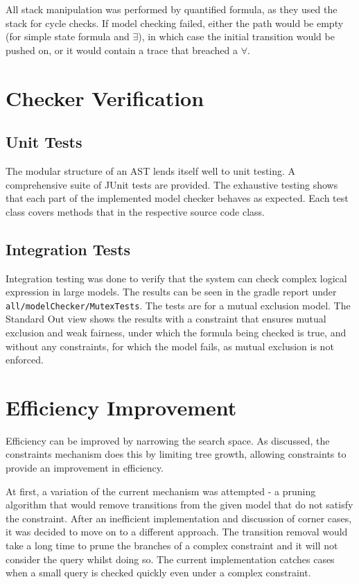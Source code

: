\documentclass[a4paper,11pt]{article}
\begin{document}
	All stack manipulation was performed by quantified formula, as they used the stack for cycle checks. If model checking failed, either the path would be empty (for simple state formula and $\exists$), in which case the initial transition would be pushed on, or it would contain a trace that breached a $\forall$.
	
	\section{Checker Verification}
	\subsection{Unit Tests}
	The modular structure of an AST lends itself well to unit testing. A comprehensive suite of JUnit tests are provided. The exhaustive testing shows that each part of the implemented model checker behaves as expected. Each test class covers methods that in the respective source code class.
	
	\subsection{Integration Tests}
	Integration testing was done to verify that the system can check complex logical expression in large models. The results can be seen in the gradle report under \texttt{all/modelChecker/MutexTests}. The tests are for a mutual exclusion model. The Standard Out view shows the results with a constraint that ensures mutual exclusion and weak fairness, under which the formula being checked is true, and without any constraints, for which the model fails, as mutual exclusion is not enforced.
	
	\section{Efficiency Improvement}
	Efficiency can be improved by narrowing the search space. As discussed, the constraints mechanism does this by limiting tree growth, allowing constraints to provide an improvement in efficiency.
	
	At first, a variation of the current mechanism was attempted - a pruning algorithm that would remove transitions from the given model that do not satisfy the constraint. After an inefficient implementation and discussion of corner cases, it was decided to move on to a different approach. The transition removal would take a long time to prune the branches of a complex constraint and it will not consider the query whilst doing so. The current implementation catches cases when a small query is checked quickly even under a complex constraint.
	
\end{document}
